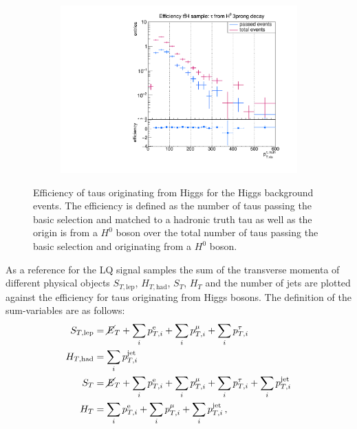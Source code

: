 \begin{figure}
\begin{subfigure}[t]{0.49\textwidth}
                \label{DividedFromH:bg:1prong}
                \end{subfigure}
                \begin{subfigure}[t]{0.49\textwidth}
                \includegraphics[width=\textwidth]{figures/plots/ttH/Divided_fromH3prong.pdf}
                \label{DividedFromH:bg:3prong}
                \end{subfigure}
\caption[Efficiency of taus originating from Higgs bosons for the Higgs background events.]{Efficiency of taus originating from Higgs for the Higgs background events. The efficiency is defined as the number of taus passing the basic selection and matched to a hadronic truth tau as well as the origin is from a $H^0$ boson over the total number of taus passing the basic selection and originating from a $H^0$ boson.}
\label{DividedFromH:bg:ttH}
\end{figure}
%
As a reference for the LQ signal samples the sum of the transverse momenta of different physical objects $S_{T,\text{lep}}$, $H_{T,\text{had}}$, $S_{T}$, $H_{T}$ and the number of jets are plotted against the efficiency for taus originating from Higgs bosons. The definition of the sum-variables are as follows:
\begin{align}
S_{T,\text{lep}}&=\cancel{E}_{T}+\sum_i p_{T,i}^{\text{e}}+\sum_i p_{T,i}^{\mu}+\sum_i p_{T,i}^{\tau} \label{STlepgedöns}\\
H_{T,\text{had}}&=\sum_i p_{T,i}^{\text{jet}} \label{HThadgedöns}\\
S_{T}&=\cancel{E}_{T}+\sum_i p_{T,i}^{\text{e}}+\sum_i p_{T,i}^{\mu}+\sum_i p_{T,i}^{\tau}+\sum_i p_{T,i}^{\text{jet}} \label{STgedöns}\\
H_{T}&=\sum_i p_{T,i}^{\text{e}}+\sum_i p_{T,i}^{\mu}+\sum_i p_{T,i}^{\text{jet}}\,\text{,}
\label{HTgedöns}
\end{align}
